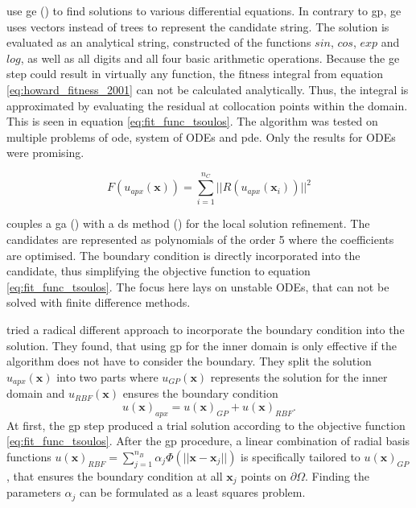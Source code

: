 \documentclass[./\jobname.tex]{subfiles}
\begin{document}
\cite{tsoulos_solving_2006} use \gls{ge} (\cite{ryan_grammatical_1998}) to find solutions to various differential equations. In contrary to \gls{gp}, \gls{ge} uses vectors instead of trees to represent the candidate string. The solution is evaluated as an analytical string, constructed of the functions $sin$, $cos$, $exp$ and $log$, as well as all digits and all four basic arithmetic operations. Because the \gls{ge} step could result in virtually any function, the fitness integral from equation \eqref{eq:howard_fitness_2001} can not be calculated analytically. Thus, the integral is approximated by evaluating the residual at collocation points within the domain. This is seen in equation \eqref{eq:fit_func_tsoulos}. The algorithm was tested on multiple problems of \gls{ode}, system of ODEs and \gls{pde}. Only the results for ODEs were promising.

\begin{equation}
\label{eq:fit_func_tsoulos}
F(u_{apx}(\mathbf{x})) = \sum_{i=1}^{n_C} ||R(u_{apx}(\mathbf{x}_i))||^2
\end{equation} 

\cite{mastorakis_unstable_2006} couples a \gls{ga} (\cite{holland_outline_1962}) with a \gls{ds} method (\cite{nelder_simplex_1965}) for the local solution refinement. The candidates are represented as polynomials of the order 5 where the coefficients are optimised. The boundary condition is directly incorporated into the candidate, thus simplifying the objective function to equation \eqref{eq:fit_func_tsoulos}. The focus here lays on unstable ODEs, that can not be solved with finite difference methods. 

\cite{sobester_genetic_2008} tried a radical different approach to incorporate the boundary condition into the solution. They found, that using \gls{gp} for the inner domain is only effective if the algorithm does not have to consider the boundary. They split the solution $u_{apx}(\mathbf{x})$ into two parts where $u_{GP}(\mathbf{x})$ represents the solution for the inner domain and $u_{RBF}(\mathbf{x})$ ensures the boundary condition 
\begin{equation}
\label{eq:solution_sobester}
u(\mathbf{x})_{apx} = u(\mathbf{x})_{GP} + u(\mathbf{x})_{RBF}.
\end{equation}
At first, the \gls{gp} step produced a trial solution according to the objective function \eqref{eq:fit_func_tsoulos}. After the \gls{gp} procedure, a linear combination of radial basis functions $u(\mathbf{x})_{RBF} = \sum_{j=1}^{n_B} \alpha_j \Phi (||\mathbf{x}-\mathbf{x}_{j}||)$ is specifically tailored to $u(\mathbf{x})_{GP}$, that ensures the boundary condition at all $\mathbf{x}_{j}$ points on $\partial \Omega$. Finding the parameters $\alpha_j$ can be formulated as a least squares problem. 
\end{document}

